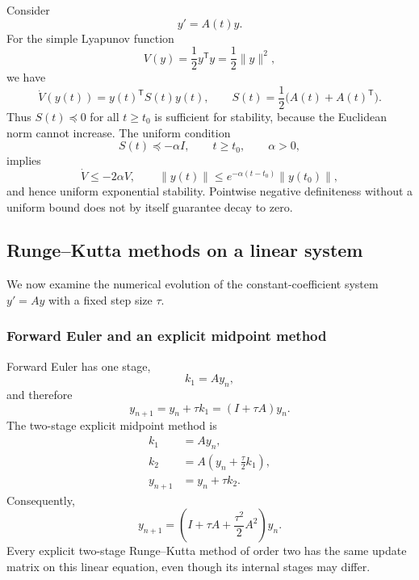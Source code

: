 Consider
\begin{equation}\label{eq:time-dependent-linear-sep-14}
  y'=A(t)y.
\end{equation}
For the simple Lyapunov function
\[
  V(y)=\frac12y^{\mathsf T}y=\frac12\lVert y\rVert^2,
\]
we have
\begin{equation}\label{eq:symmetric-part-derivative-sep-14}
  \dot V(y(t))
  =y(t)^{\mathsf T}S(t)y(t),
  \qquad
  S(t)=\frac12\bigl(A(t)+A(t)^{\mathsf T}\bigr).
\end{equation}
Thus \(S(t)\preceq0\) for all \(t\geq t_0\) is sufficient for
stability, because the Euclidean norm cannot increase. The uniform
condition
\begin{equation}\label{eq:uniform-negative-symmetric-part-sep-14}
  S(t)\preceq-\alpha I,
  \qquad t\geq t_0,
  \qquad \alpha>0,
\end{equation}
implies
\[
  \dot V\leq-2\alpha V,
  \qquad
  \lVert y(t)\rVert
  \leq e^{-\alpha(t-t_0)}\lVert y(t_0)\rVert,
\]
and hence uniform exponential stability. Pointwise negative
definiteness without a uniform bound does not by itself guarantee
decay to zero.

\subsection{Runge--Kutta methods on a linear system}

We now examine the numerical evolution of the constant-coefficient
system \(y'=Ay\) with a fixed step size \(\tau\).

\subsubsection{Forward Euler and an explicit midpoint method}

Forward Euler has one stage,
\[
  k_1=Ay_n,
\]
and therefore
\begin{equation}\label{eq:forward-euler-matrix-update-sep-14}
  y_{n+1}=y_n+\tau k_1=(I+\tau A)y_n.
\end{equation}
The two-stage explicit midpoint method is
\begin{align*}
  k_1&=Ay_n,\\
  k_2&=A\left(y_n+\frac{\tau}{2}k_1\right),\\
  y_{n+1}&=y_n+\tau k_2.
\end{align*}
Consequently,
\begin{equation}\label{eq:rk2-matrix-update-sep-14}
  y_{n+1}
  =\left(I+\tau A+\frac{\tau^2}{2}A^2\right)y_n.
\end{equation}
Every explicit two-stage Runge--Kutta method of order two has the same
update matrix on this linear equation, even though its internal stages
may differ.


